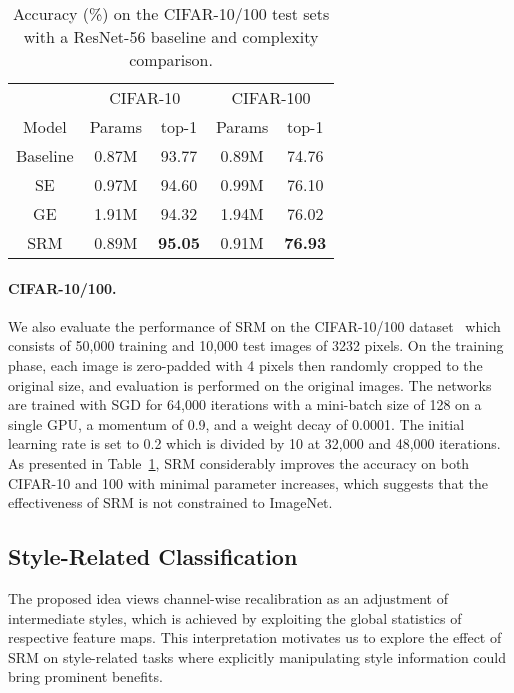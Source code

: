 \begin{table}
\caption{Accuracy (\%) on the CIFAR-10/100 test sets with a ResNet-56 baseline and complexity comparison.}
\vspace{-1em}
\begin{center}
\begin{tabular}{c|c|c|c|c}
\hline
 & \multicolumn{2}{|c|}{CIFAR-10} & \multicolumn{2}{|c}{CIFAR-100} \\ \cline{2-5}
Model & Params & top-1 & Params & top-1 \\
\hline
Baseline & 0.87M &  93.77 & 0.89M & 74.76 \\
SE & 0.97M & 94.60 & 0.99M & 76.10  \\
GE & 1.91M & 94.32 & 1.94M & 76.02  \\
SRM & 0.89M  & \textbf{95.05} & 0.91M  & \textbf{76.93} \\
\hline
\end{tabular}
\end{center}
\label{table:cifar}
\end{table}

\paragraph{CIFAR-10/100.}
We also evaluate the performance of SRM on the CIFAR-10/100 dataset~\cite{krizhevsky2009learning} which consists of 50,000 training and 10,000 test images of 3232 pixels.
On the training phase, each image is zero-padded with 4 pixels then randomly cropped to the original size, and evaluation is performed on the original images.
The networks are trained with SGD for 64,000 iterations with a mini-batch size of 128 on a single GPU, a momentum of 0.9, and a weight decay of 0.0001. The initial learning rate is set to 0.2 which is divided by 10 at 32,000 and 48,000 iterations.
As presented in Table~\ref{table:cifar}, SRM considerably improves the accuracy on both CIFAR-10 and 100 with minimal parameter increases, which suggests that the effectiveness of SRM is not constrained to ImageNet.


\subsection{Style-Related Classification}

The proposed idea views channel-wise recalibration as an adjustment of intermediate styles, which is achieved by exploiting the global statistics of respective feature maps.
This interpretation motivates us to explore the effect of SRM on style-related tasks where explicitly manipulating style information could bring prominent benefits.

